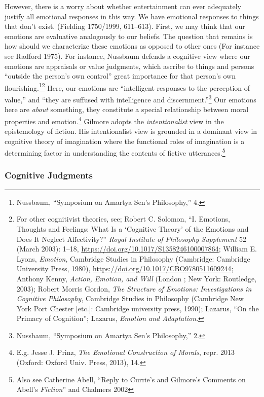 \documentclass[phdthesis,12pt,final]{wuthesis}
\theoremstyle{definition}
\theoremstyle{definition}
\theoremstyle{definition}
\theoremstyle{definition}
\theoremstyle{remark}
\begin{document}
However, there is a worry about whether entertainment can ever adequately justify all emotional responses in this way. We have emotional responses to things that don't exist. (Fielding 1750/1999, 611--613). First, we may think that our emotions are evaluative analogously to our beliefs. The question that remains is how should we characterize these emotions as opposed to other ones (For instance see Radford 1975). For instance, Nussbaum defends a cognitive view where our emotions are appraisals or value judgments, which ascribe to things and persons ``outside the person's own control'' great importance for that person's own flourishing.\footnote{Nussbaum, {``Symposium on {Amartya Sen}'s Philosophy,''} 4.}\footnote{For other cognitivist theories, see; Robert C. Solomon, {``I. {Emotions}, {Thoughts} and {Feelings}: {What} Is a {`{Cognitive Theory}'} of the {Emotions} and {Does} It {Neglect Affectivity}?''} \emph{Royal Institute of Philosophy Supplement} 52 (March 2003): 1--18, \url{https://doi.org/10.1017/S1358246100007864}; William E. Lyons, \emph{Emotion}, Cambridge Studies in Philosophy (Cambridge: Cambridge University Press, 1980), \url{https://doi.org/10.1017/CBO9780511609244}; Anthony Kenny, \emph{Action, Emotion, and Will} (London ; New York: Routledge, 2003); Robert Morris Gordon, \emph{The Structure of Emotions: Investigations in Cognitive Philosophy}, Cambridge Studies in Philosophy (Cambridge New York Port Chester {[}etc.{]}: Cambridge university press, 1990); Lazarus, {``On the {Primacy} of {Cognition}''}; Lazarus, \emph{Emotion and Adaptation}.} Here, our emotions are ``intelligent responses to the perception of value,'' and ``they are suffused with intelligence and discernment.''\footnote{Nussbaum, {``Symposium on {Amartya Sen}'s Philosophy,''} 2.} Our emotions here are \emph{about} something, they constitute a special relationship between moral properties and emotion.\footnote{E.g. Jesse J. Prinz, \emph{The {Emotional Construction} of {Morals}}, repr. 2013 (Oxford: Oxford Univ. Press, 2013), 14.} Gilmore adopts the \emph{intentionalist} view in the epistemology of fiction. His intentionalist view is grounded in a dominant view in cognitive theory of imagination where the functional roles of imagination is a determining factor in understanding the contents of fictive utterances.\footnote{Also see Catherine Abell, {``Reply to {Currie}'s and {Gilmore}'s Comments on {Abell}'s {\emph{Fiction}}''} and Chalmers 2002}

\subsubsection*{Cognitive Judgments}\label{cognitive-judgments}
\end{document}
